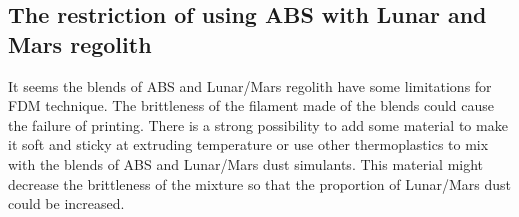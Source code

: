 \subsection{The restriction of using ABS with Lunar and Mars regolith}
It seems the blends of ABS and Lunar/Mars regolith have some limitations for FDM technique. The brittleness of the filament made of the blends could cause the failure of printing. There is a strong possibility to add some material to make it soft and sticky at extruding temperature or use other thermoplastics to mix with the blends of ABS and Lunar/Mars dust simulants. This material might decrease the brittleness of the mixture so that the proportion of Lunar/Mars dust could be increased.
